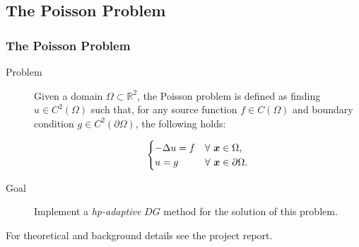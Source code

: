 \subsection{The Poisson Problem}

\begin{frame}
    \frametitle{The Poisson Problem}

    \begin{description}
        \item[Problem] Given a domain $\Omega \subset \mathbb{R}^2$, the Poisson problem is defined as finding \( u \in C^2(\Omega) \) such that, for any source function \( f \in C(\Omega) \) and boundary condition \( g \in C^2(\partial \Omega) \), the following holds:

        \begin{gather}
            \begin{cases} \notag
                - \Delta u = f & \forall ~ \bm{x} \in \Omega, \\
                u = g & \forall ~ \bm{x} \in \partial \Omega.
            \end{cases}
        \end{gather}
        \item[Goal] Implement a \textit{hp-adaptive} $DG$ method for the solution of this problem.
    \end{description}

    For theoretical and background details see the project report.
\end{frame}